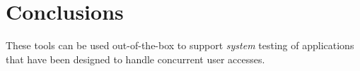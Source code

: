 \section{Conclusions}


These tools can be used out-of-the-box to support \emph{system}
testing of applications that have been designed to handle concurrent
user accesses\cite{selenium-hq}.
